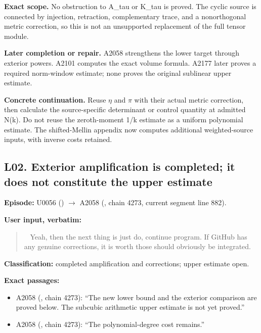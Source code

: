 \textbf{Exact scope.} No obstruction to A\_tau or K\_tau is proved. The
cyclic source is connected by injection, retraction, complementary
trace, and a nonorthogonal metric correction, so this is not an
unsupported replacement of the full tensor module.

\textbf{Later completion or repair.} A2058 strengthens the lower target
through exterior powers. A2101 computes the exact volume formula. A2177
later proves a required norm-window estimate; none proves the original
sublinear upper estimate.

\textbf{Concrete continuation.} Reuse
\allowbreak{}\ensuremath{η}\allowbreak{} and
\allowbreak{}\ensuremath{π}\allowbreak{} with their actual metric
correction, then calculate the source-specific determinant or control
quantity at admitted N(k). Do not reuse the zeroth-moment 1/k estimate
as a uniform polynomial estimate. The shifted-Mellin appendix now
computes additional weighted-source inputs, with inverse costs retained.

\subsection{L02. Exterior amplification is completed; it does not
constitute the upper
estimate}\label{TranscriptLedgerStage:l02.-exterior-amplification-is-completed-it-does-not-constitute-the-upper-estimate}

\textbf{Episode:} U0056
(\protect{})
\allowbreak{}\ensuremath{→}\allowbreak{} A2058
(\protect{}, chain 4273,
current segment line 882).

\textbf{User input, verbatim:}

\begin{quote}
~ Yeah, then the next thing is just do, continue program. If GitHub has
any genuine corrections, it is worth those should obviously be
integrated.
\end{quote}

\textbf{Classification:} completed amplification and corrections; upper
estimate open.

\textbf{Exact passages:}

\begin{itemize}
\tightlist
\item
  A2058 (\protect{}, chain
  4273): ``The new lower bound and the exterior comparison are proved
  below. The subcubic arithmetic upper estimate is not yet proved.''
\item
  A2058 (\protect{}, chain
  4273): ``The polynomial-degree cost remains.''
\end{itemize}

